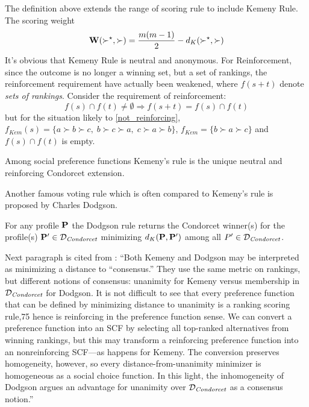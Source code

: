 The definition above extends the range of scoring rule to include Kemeny Rule. The scoring weight $$\mathbf{W}(\succ^\star, \succ) = \frac{m(m-1)}{2} - d_K(\succ^\star,\succ)$$
It's obvious that Kemeny Rule is neutral and anonymous. For Reinforcement, since the outcome is no longer a winning set, but a set of rankings, the reinforcement requirement have actually been weakened, where $f(s+t)$ denote \emph{sets of rankings}. Consider the requirement of reinforcement:
$$
f(s) \cap f(t) \neq \emptyset \Rightarrow f(s+t) = f(s) \cap f(t)
$$
but for the situation likely to \cref{not_reinforcing}, $f_{\textit{Kem}}(s) = \{a \succ b \succ c,\; b \succ c \succ a,\; c \succ a \succ b\}$, $f_{\textit{Kem}} = \{b \succ a \succ c\}$ and $f(s) \cap f(t)$ is empty.

\begin{theorem}
    Among social preference functions Kemeny's rule is the unique neutral and reinforcing Condorcet extension.
\end{theorem}

Another famous voting rule which is often compared to Kemeny's rule is proposed by Charles Dodgson.

\begin{definition}
    For any profile $\mathbf{P}$ the Dodgson rule returns the Condorcet winner(s) for the profile(s) $\mathbf{P}' \in \mathcal{D}_\textit{Condorcet}$ minimizing $d_K (\mathbf{P},\mathbf{P}')$ among all $P' \in \mathcal{D}_\textit{Condorcet}$.
\end{definition}

Next paragraph is cited from \textcite{Moulin2016}:
``Both Kemeny and Dodgson may be interpreted as minimizing a distance to “consensus.” They use the same metric on rankings, but different notions of consensus: unanimity for Kemeny versus membership in $\mathcal{D}_\textit{Condorcet}$ for Dodgson. It is not difficult to see that every preference function that can be defined by minimizing distance to unanimity is a ranking scoring rule,75 hence is reinforcing in the preference function sense. We can convert a preference function into an SCF by selecting all top-ranked alternatives from winning rankings, but this may transform a reinforcing preference function into an nonreinforcing SCF—as happens for Kemeny. The conversion preserves homogeneity, however, so every distance-from-unanimity minimizer is homogeneous as a social choice function. In this light, the inhomogeneity of Dodgson argues an advantage for unanimity over $\mathcal{D}_\textit{Condorcet}$ as a consensus notion.''
